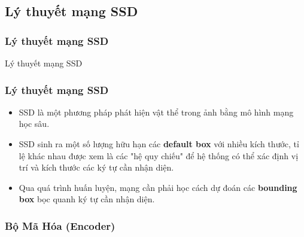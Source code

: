 \documentclass{beamer}
\begin{document}
	\subsection{Lý thuyết mạng SSD}
	
	\begin{frame}
		\frametitle{Lý thuyết mạng SSD}
		{\Huge Lý thuyết mạng SSD}
	\end{frame}
	
	\begin{frame}
		\frametitle{Lý thuyết mạng SSD}
		
		\begin{itemize}
			\item SSD là một phương pháp phát hiện vật thể trong ảnh bằng mô hình mạng học sâu.
			\item SSD sinh ra một số lượng hữu hạn các \textbf{default box} với nhiều kích thước, tỉ lệ khác nhau được xem là các "hệ quy chiếu" để hệ thống có thể xác định vị trí và kích thước các ký tự cần nhận diện. 
			\item Qua quá trình huấn luyện, mạng cần phải học cách dự đoán các \textbf{bounding box} bọc quanh ký tự cần nhận diện.
		\end{itemize}
		
		
		
		
	\end{frame}
	
	
	
	\subsubsection{Bộ Mã Hóa (Encoder)}
	
\end{document}
